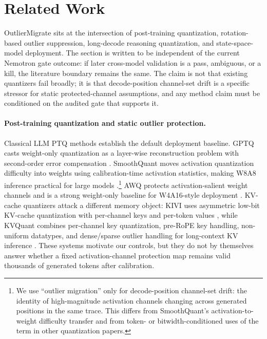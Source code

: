 \section{Related Work}
\label{sec:related-work}

OutlierMigrate sits at the intersection of post-training quantization,
rotation-based outlier suppression, long-decode reasoning quantization, and
state-space-model deployment.  The section is written to be independent of
the current Nemotron gate outcome: if later cross-model validation is a pass,
ambiguous, or a kill, the literature boundary remains the same.  The claim is
not that existing quantizers fail broadly; it is that decode-position
channel-set drift is a specific stressor for static protected-channel
assumptions, and any method claim must be conditioned on the audited gate that
supports it.

\paragraph{Post-training quantization and static outlier protection.}
Classical LLM PTQ methods establish the default deployment baseline.  GPTQ
casts weight-only quantization as a layer-wise reconstruction problem with
second-order error compensation \citep{frantar2022gptq}.  SmoothQuant moves
activation quantization difficulty into weights using calibration-time
activation statistics, making W8A8 inference practical for large models
\citep{xiao2023smoothquant}.\footnote{We use ``outlier migration'' only for
decode-position channel-set drift: the identity of high-magnitude activation
channels changing across generated positions in the same trace.  This differs
from SmoothQuant's activation-to-weight difficulty transfer and from
token- or bitwidth-conditioned uses of the term in other quantization papers.}
AWQ protects activation-salient weight channels and is a strong weight-only
baseline for W4A16-style deployment \citep{lin2023awq}.  KV-cache quantizers
attack a different memory object: KIVI uses asymmetric low-bit KV-cache
quantization with per-channel keys and per-token values \citep{liu2024kivi},
while KVQuant combines per-channel key quantization, pre-RoPE key handling,
non-uniform datatypes, and dense/sparse outlier handling for long-context KV
inference \citep{hooper2024kvquant}.  These systems motivate our controls, but
they do not by themselves answer whether a fixed activation-channel protection
map remains valid thousands of generated tokens after calibration.

